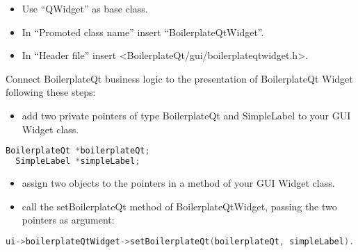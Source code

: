 \begin{itemize}
  \item
        Use ``QWidget'' as base class.
\end{itemize}

\begin{itemize}
  \item
        In ``Promoted class name'' insert ``BoilerplateQtWidget''.
\end{itemize}

\begin{itemize}
  \item
        In ``Header file'' insert
        \textless BoilerplateQt/gui/boilerplateqtwidget.h\textgreater.
\end{itemize}

Connect BoilerplateQt business logic to the presentation of
BoilerplateQt Widget following these steps:

\begin{itemize}
  \item
        add two private pointers of type BoilerplateQt and SimpleLabel to your
        GUI Widget class.
\end{itemize}

\begin{lstlisting}[language=c++, gobble=2]
  BoilerplateQt *boilerplateQt;
  SimpleLabel *simpleLabel;
\end{lstlisting}

\begin{itemize}
  \item
        assign two objects to the pointers in a method of your GUI Widget
        class.
\end{itemize}

\begin{itemize}
  \item
        call the setBoilerplateQt method of BoilerplateQtWidget, passing the
        two pointers as argument:
\end{itemize}

\begin{lstlisting}[language=c++, gobble=2]
  ui->boilerplateQtWidget->setBoilerplateQt(boilerplateQt, simpleLabel).
\end{lstlisting}
